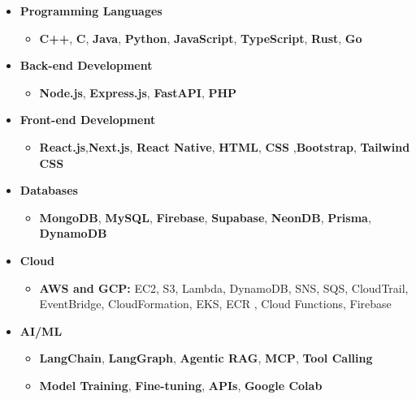 \documentclass[10pt,a4paper,ragged2e]{altacv}
\begin{document}
\begin{itemize}
\item \large{\textbf{Programming Languages}}
  \begin{itemize}
  \smallskip
    \item \textbf{C++}, \textbf{C}, \textbf{Java}, \textbf{Python}, \textbf{JavaScript}, \textbf{TypeScript}, \textbf{Rust}, \textbf{Go}
  \end{itemize}
  \smallskip

\item \large{\textbf{Back-end Development}}
  \begin{itemize}
  \smallskip
   \item \textbf{Node.js}, \textbf{Express.js}, \textbf{FastAPI}, \textbf{PHP}
  \end{itemize}
  \smallskip

\item \large{\textbf{Front-end Development}}
  \begin{itemize}
  \smallskip
    \item \textbf{React.js},\textbf{Next.js}, \textbf{React Native}, \textbf{HTML}, \textbf{CSS} ,\textbf{Bootstrap}, \textbf{Tailwind CSS}
  \end{itemize}
  \smallskip

\item \large{\textbf{Databases}}
  \begin{itemize}
  \smallskip
    \item \textbf{MongoDB}, \textbf{MySQL}, \textbf{Firebase}, \textbf{Supabase}, \textbf{NeonDB}, \textbf{Prisma}, \textbf{DynamoDB}
  \end{itemize}
  \smallskip

\item \large{\textbf{Cloud}}
  \begin{itemize}
  \smallskip
    \item \textbf{AWS and GCP:} EC2, S3, Lambda, DynamoDB, SNS, SQS, CloudTrail, EventBridge, CloudFormation, EKS, ECR , Cloud Functions, Firebase
  \end{itemize}
  \smallskip

\item \large{\textbf{AI/ML}}
  \begin{itemize}
  \smallskip
    \item \textbf{LangChain}, \textbf{LangGraph}, \textbf{Agentic RAG}, \textbf{MCP}, \textbf{Tool Calling}
    \item \textbf{Model Training}, \textbf{Fine-tuning}, \textbf{APIs}, \textbf{Google Colab}
  \end{itemize}
  \smallskip


\end{itemize}
\end{document}
